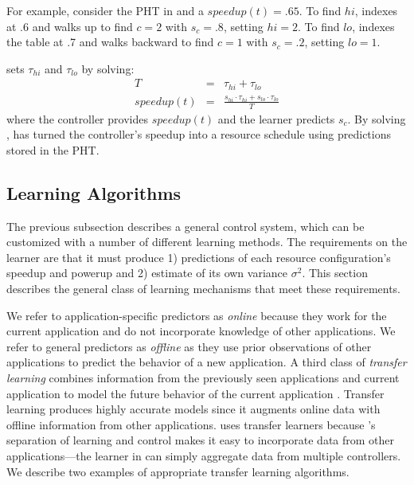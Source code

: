 For example, consider the PHT in  and a $speedup(t) =
.65$.  To find $hi$, \SYSTEM{} indexes at .6 and walks up to find
$c=2$ with $s_c=.8$, setting $hi = 2$.  To find $lo$, \SYSTEM{}
indexes the table at .7 and walks backward to find $c=1$ with
$s_c=.2$, setting $lo = 1$.

\SYSTEM{} sets $\tau_{hi}$ and $\tau_{lo}$ by solving:
\begin{eqnarray}
  T &=& \tau_{hi} + \tau_{lo}    \label{eqn:s1} \\
  speedup(t) &=& \frac{s_{hi} \cdot \tau_{hi} + s_{lo} \cdot \tau_{lo}}{T} \label{eqn:s2}
\end{eqnarray}
where the controller provides $speedup(t)$ and the learner predicts
$s_c$.  By solving , \SYSTEM{} has turned the
controller's speedup into a resource schedule using predictions stored
in the PHT.

\subsection{\SYSTEM{} Learning Algorithms}
The previous subsection describes a general control system, which can
be customized with a number of different learning methods.  The
requirements on the learner are that it must produce 1) predictions of
each resource configuration's speedup and powerup and 2) estimate of
its own variance $\sigma^2$.  This section describes the general class
of learning mechanisms that meet these requirements.

We refer to application-specific predictors as \emph{online} because
they work for the current application and do not incorporate knowledge
of other applications.  We refer to general predictors as
\emph{offline} as they use prior observations of other applications to
predict the behavior of a new application. A third class of
\emph{transfer learning} combines information from the previously seen
applications and current application to model the future behavior of
the current application \cite{pan2010survey}. Transfer learning
produces highly accurate models since it augments online data with
offline information from other applications.  \SYSTEM{} uses transfer
learners because \SYSTEM{}'s separation of learning and control makes
it easy to incorporate data from other applications---the learner in
 can simply aggregate data from multiple
controllers. We describe two examples of appropriate transfer learning
algorithms.

